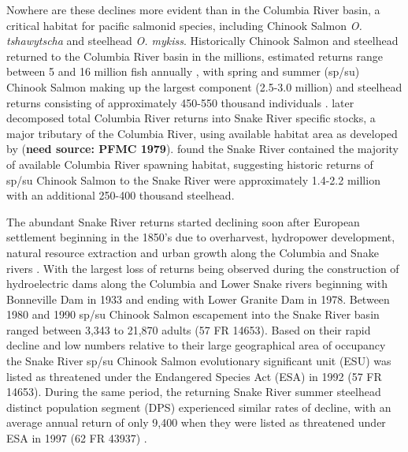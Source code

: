 \documentclass[10pt,a4paper]{article}
\begin{document}
Nowhere are these declines more evident than in the Columbia River basin, a critical habitat for pacific salmonid species, including Chinook Salmon \emph{O. tshawytscha} and steelhead \emph{O. mykiss}. Historically Chinook Salmon and steelhead returned to the Columbia River basin in the millions, estimated returns range between 5 and 16 million fish annually \autocite{chapman_salmon_1986,isab_density_2015,npcc_compilation_1986}, with spring and summer (sp/su) Chinook Salmon making up the largest component (2.5-3.0 million) and steelhead returns consisting of approximately 450-550 thousand individuals \autocite{chapman_salmon_1986}. \textcite{chapman_historical_2003} later decomposed total Columbia River returns into Snake River specific stocks, a major tributary of the Columbia River, using available habitat area as developed by (\textbf{need source: PFMC 1979}). \textcite{chapman_historical_2003} found the Snake River contained the majority of available Columbia River spawning habitat, suggesting historic returns of sp/su Chinook Salmon to the Snake River were approximately 1.4-2.2 million with an additional 250-400 thousand steelhead.

The abundant Snake River returns started declining soon after European settlement beginning in the 1850's due to overharvest, hydropower development, natural resource extraction and urban growth along the Columbia and Snake rivers \autocite{nehlsen_pacific_1991}. With the largest loss of returns being observed during the construction of hydroelectric dams along the Columbia and Lower Snake rivers beginning with Bonneville Dam in 1933 and ending with Lower Granite Dam in 1978. Between 1980 and 1990 sp/su Chinook Salmon escapement into the Snake River basin ranged between 3,343 to 21,870 adults (57 FR 14653)\autocite{noauthor_federal_1992}. Based on their rapid decline and low numbers relative to their large geographical area of occupancy the Snake River sp/su Chinook Salmon evolutionary significant unit (ESU) was listed as threatened under the Endangered Species Act (ESA) in 1992 (57 FR 14653)\autocite{noauthor_federal_1992}. During the same period, the returning Snake River summer steelhead distinct population segment (DPS) experienced similar rates of decline, with an average annual return of only 9,400 when they were listed as threatened under ESA in 1997 (62 FR 43937) \autocite{noauthor_federal_1997}.
\end{document}
